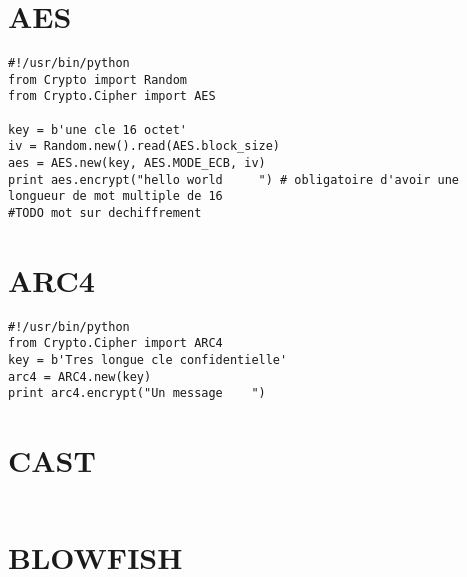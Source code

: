 \documentclass[a4paper, 12pt]{report}
\begin{document}
\section{AES}

\begin{lstlisting}
#!/usr/bin/python
from Crypto import Random
from Crypto.Cipher import AES

key = b'une cle 16 octet'
iv = Random.new().read(AES.block_size)
aes = AES.new(key, AES.MODE_ECB, iv)
print aes.encrypt("hello world     ") # obligatoire d'avoir une longueur de mot multiple de 16
#TODO mot sur dechiffrement
\end{lstlisting}

\section{ARC4}

\begin{lstlisting}
#!/usr/bin/python
from Crypto.Cipher import ARC4
key = b'Tres longue cle confidentielle'
arc4 = ARC4.new(key)
print arc4.encrypt("Un message    ")
\end{lstlisting}

\section{CAST}

\begin{lstlisting}

\end{lstlisting}

\section{BLOWFISH}
\end{document}
